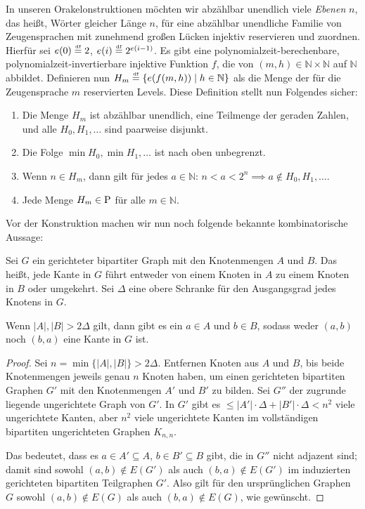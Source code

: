 In unseren Orakelonstruktionen möchten wir abzählbar unendlich viele \emph{Ebenen} $n$, das heißt, Wörter gleicher Länge $n$, für eine abzählbar unendliche Familie von Zeugensprachen mit zunehmend großen Lücken injektiv reservieren und zuordnen.
Hierfür sei $e(0) \defeq 2$, $e(i) \defeq 2^{e(i-1)}$.
Es gibt eine polynomialzeit-berechenbare, polynomialzeit-invertierbare injektive Funktion $f$, die von $(m,h)\in\mathbb N\times\mathbb N$ auf $\mathbb N$ abbildet.
Definieren nun $H_m \defeq \{ e(f(m,h)) \mid h\in\mathbb N \}$ als die Menge der für die Zeugensprache $m$ reservierten Levels.
Diese Definition stellt nun Folgendes sicher:
\begin{observation}\label{obs:leveldefinitions}
    \begin{enumerate}
        \item Die Menge $H_m$ ist abzählbar unendlich, eine Teilmenge der geraden Zahlen, und alle $H_0, H_1, \dots$ sind paarweise disjunkt.
        \item Die Folge $\min H_0, \min H_1, \dots$ ist nach oben unbegrenzt.
        \item Wenn $n\in H_m$, dann gilt für jedes $a\in\mathbb N$: $n<a<2^{n} \implies a\not\in H_0, H_1, \dots$.
        \item Jede Menge $H_m\in \P$ für alle $m\in\mathbb N$.
    \end{enumerate}
\end{observation}
Vor der Konstruktion machen wir nun noch folgende bekannte kombinatorische Aussage:
\begin{lemma}\label{lemma:bipartite}
    Sei $G$ ein gerichteter bipartiter Graph mit den Knotenmengen $A$ und $B$.
    Das heißt, jede Kante in $G$ führt entweder von einem Knoten in $A$ zu einem Knoten in $B$ oder umgekehrt.
    Sei $\Delta$ eine obere Schranke für den Ausgangsgrad jedes Knotens in $G$.

    Wenn $|A|,|B|>2\Delta$ gilt, dann gibt es ein $a\in A$ und $b\in B$, sodass weder $(a,b)$ noch $(b,a)$ eine Kante in $G$ ist.
\end{lemma}
\begin{proof}
    Sei $n=\min\{|A|,|B|\}>2\Delta$.
    Entfernen Knoten aus $A$ und $B$, bis beide Knotenmengen jeweils genau $n$ Knoten haben, um einen gerichteten bipartiten Graphen $G'$ mit den Knotenmengen $A'$ und $B'$ zu bilden.
    Sei $G''$ der zugrunde liegende ungerichtete Graph von $G'$.
    In $G'$ gibt es $\leq |A'|\cdot \Delta + |B'|\cdot\Delta<n^2$ viele ungerichtete Kanten,
    aber $n^2$ viele ungerichtete Kanten im vollständigen bipartiten ungerichteten Graphen $K_{n,n}$.

    Das bedeutet, dass es $a\in A'\subseteq A$, $b\in B'\subseteq B$ gibt, die in $G''$ nicht adjazent sind; damit sind sowohl $(a,b)\not\in E(G')$ als auch $(b,a)\not\in E(G')$ im induzierten gerichteten bipartiten Teilgraphen $G'$.
    Also gilt für den ursprünglichen Graphen $G$ sowohl $(a,b)\not\in E(G)$ als auch $(b,a)\not\in E(G)$, wie gewünscht.
\end{proof}

